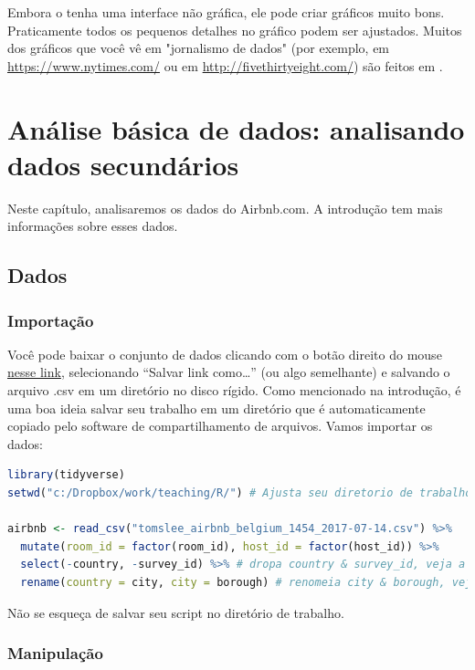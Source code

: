 \documentclass{article}
\begin{document}
Embora o \faRProject tenha uma interface não gráfica, ele pode criar gráficos muito bons. Praticamente todos os pequenos detalhes no gráfico podem ser ajustados. Muitos dos gráficos que você vê em "jornalismo de dados" (por exemplo, em \href{https://www.nytimes.com/}{https://www.nytimes.com/} ou em \href{http://fivethirtyeight.com/}{http://fivethirtyeight.com/}) são feitos em \faRProject.

\newpage
\section{Análise básica de dados: analisando dados secundários}

Neste capítulo, analisaremos os dados do Airbnb.com. A introdução tem mais informações sobre esses dados.

\subsection{Dados}
\subsubsection{Importação}

Você pode baixar o conjunto de dados clicando com o botão direito do mouse \href{http://users.telenet.be/samuelfranssens/tutorial_data/tomslee_airbnb_belgium_1454_2017-07-14.csv}{nesse link}, selecionando “Salvar link como…” (ou algo semelhante) e salvando o arquivo .csv em um diretório no disco rígido. Como mencionado na introdução, é uma boa ideia salvar seu trabalho em um diretório que é automaticamente copiado pelo software de compartilhamento de arquivos. Vamos importar os dados:


\begin{lstlisting}[language=R]
library(tidyverse)
setwd("c:/Dropbox/work/teaching/R/") # Ajusta seu diretorio de trabalho

airbnb <- read_csv("tomslee_airbnb_belgium_1454_2017-07-14.csv") %>% 
  mutate(room_id = factor(room_id), host_id = factor(host_id)) %>% 
  select(-country, -survey_id) %>% # dropa country & survey_id, veja a introdução de por que fazemos isso
  rename(country = city, city = borough) # renomeia city & borough, veja a introdução de por que fazemos isso
\end{lstlisting}

Não se esqueça de salvar seu script no diretório de trabalho.

\subsubsection{Manipulação}
\end{document}

